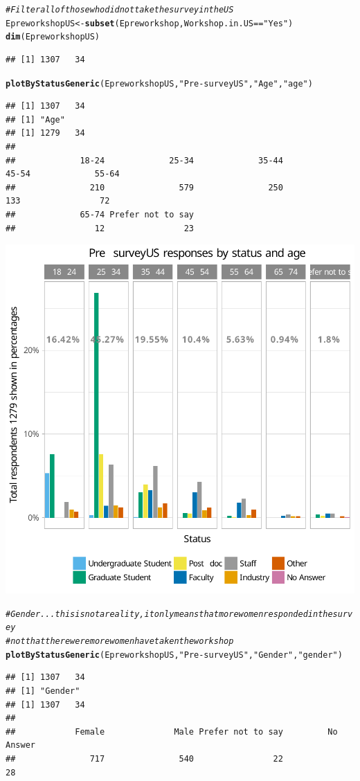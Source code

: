 \documentclass{article}\usepackage[]{graphicx}\usepackage[]{color}
\makeatletter
\newcommand{\hlstr}[1]{\textcolor[rgb]{0.192,0.494,0.8}{#1}}%
\newcommand{\hlcom}[1]{\textcolor[rgb]{0.678,0.584,0.686}{\textit{#1}}}%
\newcommand{\hlopt}[1]{\textcolor[rgb]{0,0,0}{#1}}%
\newcommand{\hlstd}[1]{\textcolor[rgb]{0.345,0.345,0.345}{#1}}%
\newcommand{\hlkwb}[1]{\textcolor[rgb]{0.69,0.353,0.396}{#1}}%
\newcommand{\hlkwd}[1]{\textcolor[rgb]{0.737,0.353,0.396}{\textbf{#1}}}%
\newenvironment{kframe}{%
 \def\at@end@of@kframe{}%
 \ifinner\ifhmode%
  \def\at@end@of@kframe{\end{minipage}}%
  \begin{minipage}{\columnwidth}%
 \fi\fi%
 \def\FrameCommand##1{\hskip\@totalleftmargin \hskip-\fboxsep
 \colorbox{shadecolor}{##1}\hskip-\fboxsep
     \hskip-\linewidth \hskip-\@totalleftmargin \hskip\columnwidth}%
 \MakeFramed {\advance\hsize-\width
   \@totalleftmargin\z@ \linewidth\hsize
   \@setminipage}}%
 {\par\unskip\endMakeFramed%
 \at@end@of@kframe}
\newenvironment{knitrout}{}{} %
\makeatother
\begin{document}
\begin{knitrout}
\color{fgcolor}\begin{kframe}
\begin{alltt}
\hlcom{# Filter all of those who did not take the survey in the US }
\hlstd{EpreworkshopUS} \hlkwb{<-} \hlkwd{subset}\hlstd{(Epreworkshop, Workshop.in.US} \hlopt{==} \hlstr{"Yes"}\hlstd{)}
\hlkwd{dim}\hlstd{(EpreworkshopUS)}
\end{alltt}
\begin{verbatim}
## [1] 1307   34
\end{verbatim}
\begin{alltt}
\hlkwd{plotByStatusGeneric}\hlstd{(EpreworkshopUS,} \hlstr{"Pre-surveyUS"}\hlstd{,} \hlstr{"Age"} \hlstd{,} \hlstr{"age"}\hlstd{)}
\end{alltt}
\begin{verbatim}
## [1] 1307   34
## [1] "Age"
## [1] 1279   34
## 
##             18-24             25-34             35-44             45-54             55-64 
##               210               579               250               133                72 
##             65-74 Prefer not to say 
##                12                23
\end{verbatim}
\end{kframe}

{\centering \includegraphics[width=.6\linewidth]{figure/calls-Rnwplotting-presurvey-dataUS-1} 

}


\begin{kframe}\begin{alltt}
\hlcom{# Gender... this is not a reality, it only means that more women responded in the survey}
\hlcom{# not that there were more women have taken the workshop}
\hlkwd{plotByStatusGeneric}\hlstd{(EpreworkshopUS,} \hlstr{"Pre-surveyUS"}\hlstd{,} \hlstr{"Gender"} \hlstd{,} \hlstr{"gender"}\hlstd{)}
\end{alltt}
\begin{verbatim}
## [1] 1307   34
## [1] "Gender"
## [1] 1307   34
## 
##            Female              Male Prefer not to say         No Answer 
##               717               540                22                28
\end{verbatim}
\end{kframe}


\end{knitrout}
\end{document}

